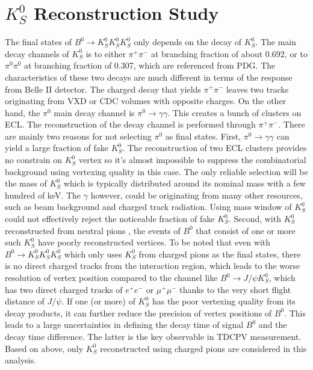 \chapter{$K_S^0$ Reconstruction Study}

The final states of $B^0 \to K_S^0  K_S^0  K_S^0 $ only depends on the decay of $K_S^0$. The main decay channels of $K_S^0$ is to either $\pi^+ \pi^-$ at branching fraction of about 0.692, or to $\pi^0 \pi^0$ at branching fraction of 0.307, which are referenced from PDG\cite{pdg}.
 The characteristics of these two decays are much different in terms of the response from Belle II detector. The charged decay that yields  $\pi^+ \pi^-$ leaves two tracks originating from VXD or CDC volumes with opposite charges. On the other hand, the $\pi^0$ main decay channel is $\pi^0 \to \gamma \gamma$. This creates a bunch of clusters on ECL. The reconstruction of the decay channel is performed through  $\pi^+ \pi^-$. There are mainly two reasons for not selecting $\pi^0$ as final states.
 First, $\pi^0 \to \gamma \gamma$ can yield a large fraction of fake $K_S^0$. The reconstruction of two ECL clusters provides no constrain on $K_S^0$ vertex so it's almost impossible to suppress the combinatorial background using vertexing quality in this case. The only reliable selection will be the mass of $K_S^0$ which is typically distributed around its nominal mass with a few hundred of keV. 
 The $\gamma$ however, could be originating from many other resources, such as beam background and charged track radiation. Using mass window of $K_S^0$ could not effectively reject the noticeable fraction of fake $K_S^0$. Second, with $K_S^0$ reconstructed from neutral pions , the events of $B^0$ that consist of one or more such $K_S^0$ have poorly reconstructed vertices. To be noted that even with $B^0 \to K_S^0  K_S^0  K_S^0 $ which only uses $K_S^0$ from charged pions as the final states, there is no direct charged tracks from the interaction region, which leads to the worse resolution of vertex position compared to the channel like $B^0 \to J/\psi K_S^0$, which has two direct charged tracks of $e^+e^-$ or $\mu^+ \mu^-$ thanks to the very short flight distance of $J/\psi$. If one (or more) of $K^0_S$ has the poor vertexing quality from its decay products, it can further reduce the precision of vertex positions of $B^0$. This leads to a large uncertainties in defining the decay time of signal $B^0$ and the decay time difference. The latter is the key observable in TDCPV measurement. Based on above, only $K_S^0$ reconstructed using charged pions are considered in this analysis.
 
